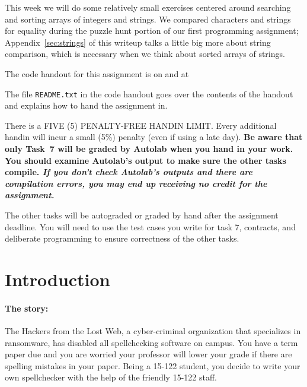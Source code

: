 \documentclass[12pt]{exam}
\begin{document}
\hwTitle

\noindent
This week we will do some relatively small exercises centered around
searching and sorting arrays of integers and strings. We compared
characters and strings for equality during the puzzle hunt portion of
our first programming assignment; Appendix~\ref{sec:strings} of this
writeup talks a little big more about string comparison, which is
necessary when we think about sorted arrays of strings.

\bigskip
\noindent
The code handout for this assignment is on \autolab{} and at
\begin{center}
\end{center}
The file \lstinline'README.txt' in the code handout goes over the contents
of the handout and explains how to hand the assignment in.

\bigskip
\noindent
There is a FIVE (5) PENALTY-FREE HANDIN LIMIT.  Every additional
handin will incur a small (5\%) penalty (even if using a late day).
{\bf Be aware that only Task~7 will be graded by Autolab when you hand
  in your work. You should examine Autolab's output to make sure the
  other tasks compile. \emph{If you don't check Autolab's outputs and
    there are compilation errors, you may end up receiving no credit
    for the assignment.}}

The other tasks will be autograded or graded by hand after the
assignment deadline. You will need to use the test cases you write for
task 7, contracts, and deliberate programming to ensure correctness of
the other tasks.

\newpage
\section{Introduction}
\label{sect:common}

\paragraph{The story:} %
The Hackers from the Lost Web, a cyber-criminal organization that
specializes in ransomware, has disabled all spellchecking software on
campus.
You have a term paper due and you are worried your professor will
lower your grade if there are spelling mistakes in your paper. Being a
15-122 student, you decide to write your own spellchecker with the
help of the friendly 15-122 staff.
\end{document}
